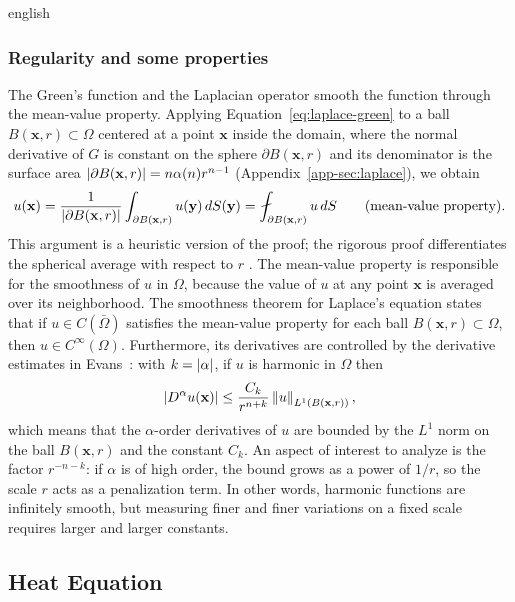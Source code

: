 \begin{hyphenrules}{english}
\subsubsection{Regularity and some properties}
The Green's function and the Laplacian operator smooth the function through the mean-value property.
Applying Equation~\eqref{eq:laplace-green} to a ball $B(\mathbf{x},r)\subset\Omega$ centered at a point $\mathbf{x}$
inside the domain, where the normal derivative of $G$ is constant on the sphere $\partial B(\mathbf{x},r)$ and
its denominator is the surface area $\left\lvert \partial B(\mathbf{x},r) \right\rvert=n\alpha(n)r^{n-1}$
(Appendix~\ref{app-sec:laplace}), we obtain
\begin{equation}
  u(\mathbf{x})=\frac{1}{\abs{\partial B(\mathbf{x},r)}}\int_{\partial B(\mathbf{x},r)}u(\mathbf{y})\,d S(\mathbf{y})
  =\fint_{\partial B(\mathbf{x},r)}u\,d S \qquad\text{(mean-value property)}.
  \label{eq:mvp}
\end{equation}
This argument is a heuristic version of the proof; the rigorous proof differentiates the spherical
average with respect to $r$ \cite[Section 2.2.2]{evans2010}. The mean-value property is
responsible for the smoothness of $u$ in $\Omega$, because the value of $u$ at any point $\mathbf{x}$ is
averaged over its neighborhood. The smoothness theorem for Laplace's equation states that if
$u\in C(\bar\Omega)$ satisfies the mean-value property for each ball $B(\mathbf{x},r)\subset\Omega$, then
$u\in C^\infty(\Omega)$. Furthermore, its derivatives are controlled by the derivative estimates in
Evans~\cite{evans2010}: with $k=\left\lvert \alpha \right\rvert$, if $u$ is harmonic in $\Omega$ then
\begin{equation}
  \left\lvert D^\alpha u(\mathbf{x}) \right\rvert\le\frac{C_k}{r^{n+k}}\left\lVert u \right\rVert_{L^1(B(\mathbf{x},r))},
  \label{eq:harmonic-estimate}
\end{equation}
which means that the $\alpha$-order derivatives of $u$ are bounded by the $L^1$ norm on the ball
$B(\mathbf{x},r)$ and the constant $C_k$. An aspect of interest to analyze is the factor $r^{-n-k}$: if $\alpha$
is of high order, the bound grows as a power of $1/r$, so the scale $r$ acts as a penalization term.
In other words, harmonic functions are infinitely smooth, but measuring finer and finer variations on a
fixed scale requires larger and larger constants.

\subsection{Heat Equation}\label{subsec:heat}


\end{hyphenrules}
